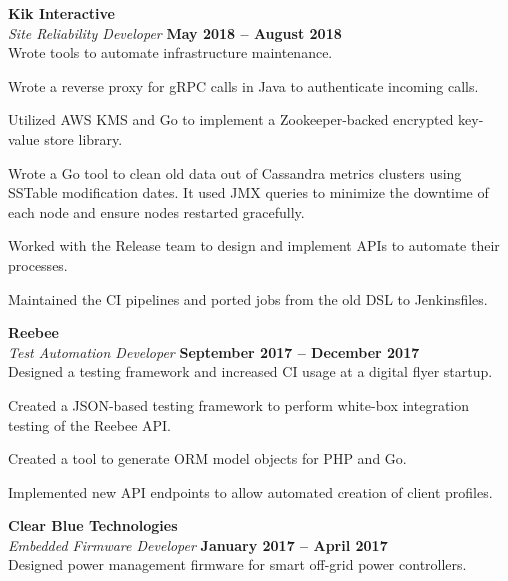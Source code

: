 \documentclass[margin,line]{resume}
\begin{document}
\begin{resume}
\textbf{\listing Kik Interactive} \vspace{2mm}\\\vspace{1mm}%
\textsl{Site Reliability Developer} \hfill \textbf{May 2018 -- August 2018}\\
Wrote tools to automate infrastructure maintenance.\\
\begin{tightemize}
\item Wrote a reverse proxy for gRPC calls in Java to authenticate incoming calls.
\item Utilized AWS KMS and Go to implement a Zookeeper-backed encrypted key-value store library.
\item Wrote a Go tool to clean old data out of Cassandra metrics clusters using SSTable modification dates.  It used JMX queries to minimize the downtime of each node and ensure nodes restarted gracefully.
\item Worked with the Release team to design and implement APIs to automate their processes.
\item Maintained the CI pipelines and ported jobs from the old DSL to Jenkinsfiles.
\end{tightemize}

\vspace{1mm}
\textbf{\listing Reebee} \vspace{2mm}\\\vspace{1mm}%
\textsl{Test Automation Developer} \hfill \textbf{September 2017 -- December 2017}\\
Designed a testing framework and increased CI usage at a digital flyer startup.\\
\begin{tightemize}
\item Created a JSON-based testing framework to perform white-box integration testing of the Reebee API.
\item Created a tool to generate ORM model objects for PHP and Go.
\item Implemented new API endpoints to allow automated creation of client profiles.
\end{tightemize}

\vspace{1mm}
\textbf{\listing Clear Blue Technologies} \vspace{2mm}\\\vspace{1mm}%
\textsl{Embedded Firmware Developer} \hfill \textbf{January 2017 -- April 2017}\\
Designed power management firmware for smart off-grid power controllers.


\end{resume}
\end{document}
